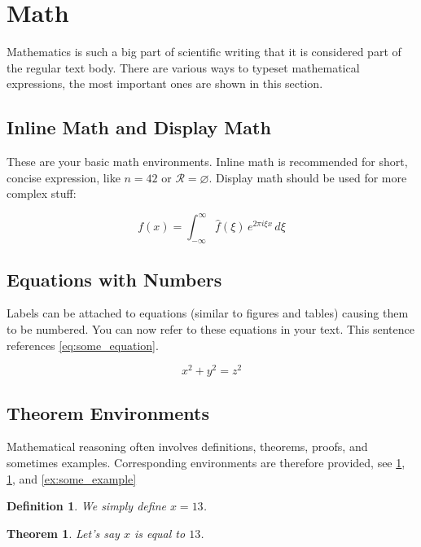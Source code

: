 \documentclass[parskip=half]{scrbook}
\newtheorem{definition}{Definition}
\newtheorem{theorem}{Theorem}
\let\emptyset\varnothing
\begin{document}
\section{Math}

Mathematics is such a big part of scientific writing that it is considered part of the regular text body.
There are various ways to typeset mathematical expressions, the most important ones are shown in this section.

\subsection{Inline Math and Display Math}

These are your basic math environments.
Inline math is recommended for short, concise expression, like $n = 42$ or $\mathcal{R} = \emptyset$.
Display math should be used for more complex stuff:

$$f(x) = \int_{-\infty}^\infty \hat f(\xi)\,e^{2 \pi i \xi x} \,d\xi$$

\subsection{Equations with Numbers}

Labels can be attached to equations (similar to figures and tables) causing them to be numbered.
You can now refer to these equations in your text.
This sentence references \cref{eq:some_equation}.

\begin{equation}
	x^2 + y^2 = z^2
	\label{eq:some_equation}
\end{equation}

\subsection{Theorem Environments}

Mathematical reasoning often involves definitions, theorems, proofs, and sometimes examples.
Corresponding environments are therefore provided, see \cref{def:some_definition}, \cref{th:some_theorem}, and \cref{ex:some_example}

\begin{definition}
	We simply define $x = 13$.
	\label{def:some_definition}
\end{definition}

\begin{theorem}
	Let's say $x$ is equal to $13$.
	\label{th:some_theorem}
\end{theorem}
\end{document}
